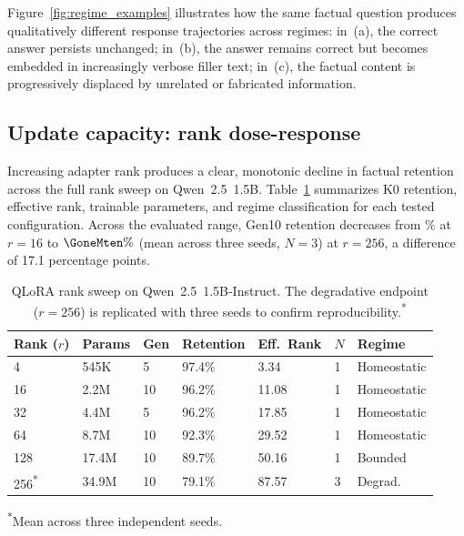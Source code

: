 \documentclass[a4paper,fleqn]{cas-dc}
\newif\ifshowchanges
\newcommand{\rev}[1]{\ifshowchanges{\color{blue}#1}\else{#1}\fi}
\begin{document}
Figure~\ref{fig:regime_examples} illustrates how the same factual question
produces qualitatively different response trajectories across regimes: in~(a),
the correct answer persists unchanged; in~(b), the answer remains correct but
becomes embedded in increasingly verbose filler text; in~(c), the factual
content is progressively displaced by unrelated or fabricated information.

\subsection{Update capacity: rank dose-response}\label{sec:res_capacity}

Increasing adapter rank produces a clear, monotonic decline in factual retention
across the full rank sweep on Qwen~2.5~1.5B.
Table~\ref{tab:rank_sweep} summarizes K0 retention, effective rank, trainable
parameters, and regime classification for each tested configuration. Across the
evaluated range, Gen10 retention decreases from \RsixteenMten\% at $r=16$ to
\rev{$\GoneMten\%$ (mean across three seeds, $N=3$)} at
$r=256$, a difference of 17.1 percentage points.

\begin{table}[width=.95\linewidth,cols=6,pos=htbp]
\caption{QLoRA rank sweep on Qwen~2.5~1.5B-Instruct. The degradative endpoint
($r=256$) is replicated with three seeds to confirm
reproducibility.\textsuperscript{*}}\label{tab:rank_sweep}
\begin{tabular*}{\tblwidth}{@{}l@{\hskip 4pt}l@{\hskip 4pt}l@{\hskip 4pt}l@{\hskip 4pt}l@{\hskip 4pt}l@{\hskip 4pt}l@{}}
\toprule
Rank ($r$) & Params & Gen & Retention & Eff.\ Rank & \rev{$N$} & Regime \\
\midrule
4   & 545K  & 5  & 97.4\%  & 3.34  & \rev{1} & \rev{Homeostatic} \\
16  & 2.2M  & 10 & 96.2\%  & 11.08 & \rev{1} & \rev{Homeostatic} \\
32  & 4.4M  & 5  & 96.2\%  & 17.85 & \rev{1} & \rev{Homeostatic} \\
64  & 8.7M  & 10 & 92.3\%  & 29.52 & \rev{1} & \rev{Homeostatic} \\
128 & 17.4M & 10 & 89.7\%  & 50.16 & \rev{1} & Bounded \\
256\textsuperscript{*} & 34.9M & 10 & 79.1\%  & 87.57 & \rev{3} & Degrad. \\
\bottomrule
\end{tabular*}
{\footnotesize \textsuperscript{*}Mean across three independent seeds.}
\end{table}
\end{document}
